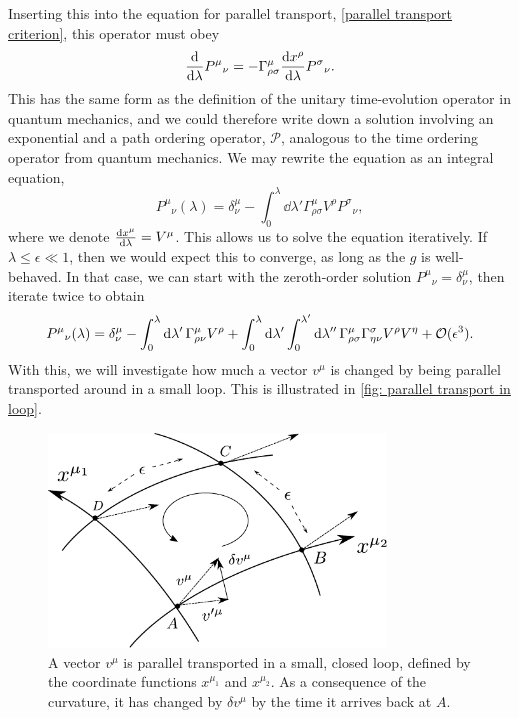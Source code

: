 %
Inserting this into the equation for parallel transport, \autoref{parallel transport criterion}, this operator must obey
%
\begin{equation}
    \odv{}{\lambda} P^\mu{}_\nu = - \Gamma^\mu_{\rho \sigma}  \odv{x^\rho}{\lambda}P^\sigma{}_\nu.
\end{equation}
%
This has the same form as the definition of the unitary time-evolution operator in quantum mechanics, and we could therefore write down a solution involving an exponential and a path ordering operator, $\mathcal P$, analogous to the time ordering operator from quantum mechanics.
We may rewrite the equation as an integral equation,
%
\begin{equation}
    P^\mu{}_\nu(\lambda) = \delta^\mu_\nu 
    - \int^\lambda_0 \dd \lambda' \Gamma^\mu_{\rho \sigma} V^\rho P^\sigma{}_\nu,
\end{equation}
%
where we denote $\odv{x^\mu}{\lambda} = V^\mu$.
This allows us to solve the equation iteratively.
If $\lambda \leq \epsilon \ll 1$, then we would expect this to converge, as long as the $g$ is well-behaved.
In that case, we can start with the zeroth-order solution $P^{\mu}{}_\nu = \delta^\mu_\nu$, then iterate twice to obtain
%
\begin{equation}
    \label{iterative paralell propagator}
    P^\mu{}_\nu(\lambda) 
    = 
    \delta^\mu_\nu 
    - \int_0^\lambda \text{d} \lambda' \, 
    \Gamma^\mu_{\rho \nu} V^\rho
    + \int_0^{\lambda} \text{d} \lambda ' \int_0^{\lambda'} \text{d} \lambda ''\,
    \Gamma^\mu_{\rho \sigma} \Gamma^\sigma_{\eta \nu} V^\rho V^\eta
    + \mathcal O(\epsilon^3).
\end{equation}
%
With this, we will investigate how much a vector $v^\mu$ is changed by being parallel transported around in a small loop.
This is illustrated in \autoref{fig: parallel transport in loop}.
%
\begin{figure}
    \centering
    \includegraphics[width=0.8\textwidth]{figurer/parallel_transport.pdf}
    \caption{A vector $v^\mu$ is parallel transported in a small, closed loop, defined by the coordinate functions $x^{\mu_1}$ and $x^{\mu_2}$.
    As a consequence of the curvature, it has changed by $\delta v^\mu$ by the time it arrives back at $A$.}
    \label{fig: parallel transport in loop}
\end{figure}
